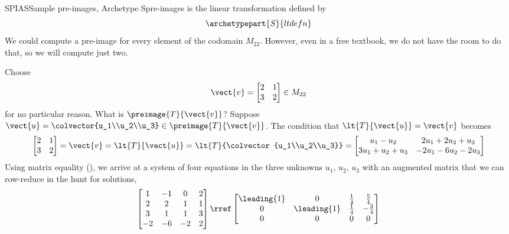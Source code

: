 \begin{example}{SPIAS}{Sample pre-images, Archetype S}{pre-images}
 is the linear transformation defined by
%
\begin{equation*}
\archetypepart{S}{ltdefn}
\end{equation*}
%
We could compute a pre-image for every element of the codomain $M_{22}$.  However, even in a free textbook, we do not have the room to do that, so we will compute just two.\par
%
Choose
%
\begin{equation*}
\vect{v}=
\begin{bmatrix}
2&1\\3&2
\end{bmatrix}
\in M_{22}
\end{equation*}
%
for no particular reason.  What is $\preimage{T}{\vect{v}}$?  Suppose $\vect{u}=\colvector{u_1\\u_2\\u_3}\in\preimage{T}{\vect{v}}$.  The condition that $\lt{T}{\vect{u}}=\vect{v}$ becomes
%
\begin{equation*}
\begin{bmatrix}
2&1\\3&2
\end{bmatrix}
=\vect{v}
=\lt{T}{\vect{u}}
=\lt{T}{\colvector{u_1\\u_2\\u_3}}\\
=\begin{bmatrix}
u_1-u_2&2u_1+2u_2+u_3\\
3u_1+u_2+u_3&-2u_1-6u_2-2u_3
\end{bmatrix}
\end{equation*}
%
Using matrix equality (), we arrive at a system of four equations in the three unknowns $u_1,\,u_2,\,u_3$ with an augmented matrix that we can row-reduce in the hunt for solutions,
%
\begin{equation*}
\begin{bmatrix}
1 & -1 & 0 & 2\\
2 & 2 & 1 & 1\\
3 & 1 & 1 & 3\\
-2 & -6 & -2 & 2
\end{bmatrix}
\rref
\begin{bmatrix}
\leading{1} & 0 & \frac{1}{4} &  \frac{5}{4}\\
0 & \leading{1} & \frac{1}{4} &  -\frac{3}{4}\\
0 & 0 & 0 &  0\\

\end{bmatrix}
\end{equation*}
\end{example}
